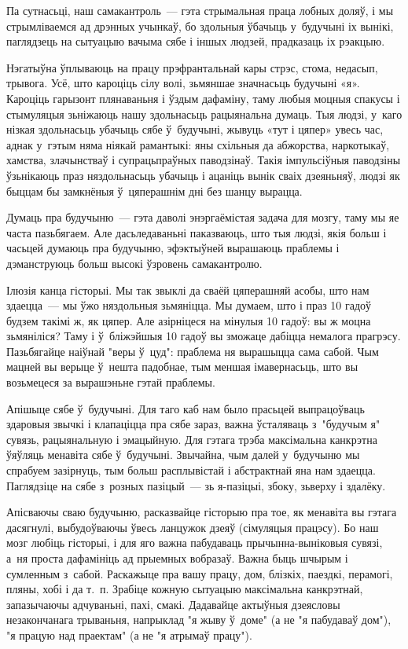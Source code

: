 Па сутнасьці, наш самакантроль~--- гэта стрымальная праца лобных доляў, і мы стрымліваемся ад дрэнных учынкаў, бо здольныя ўбачыць у~будучыні іх вынікі, паглядзець на сытуацыю вачыма сябе і іншых людзей, прадказаць іх рэакцыю.

Нэгатыўна ўплываюць на працу прэфрантальнай кары стрэс, стома, недасып, трывога. Усё, што кароціць сілу волі, зьмяншае значнасьць будучыні «я». Кароціць гарызонт плянаваньня і ўздым дафаміну, таму любыя моцныя спакусы і стымуляцыя зьніжаюць нашу здольнасьць рацыянальна думаць. Тыя людзі, у~каго нізкая здольнасьць убачыць сябе ў~будучыні, жывуць «тут і цяпер» увесь час, аднак у~гэтым няма ніякай рамантыкі: яны схільныя да абжорства, наркотыкаў, хамства, злачынстваў і супрацьпраўных паводзінаў. Такія імпульсіўныя паводзіны ўзьнікаюць праз няздольнасьць убачыць і ацаніць вынік сваіх дзеяньняў, людзі як быццам бы замкнёныя ў~цяперашнім дні без шанцу вырацца.

Думаць пра будучыню~--- гэта даволі энэргаёмістая задача для мозгу, таму мы яе часта пазьбягаем. Але дасьледаваньні паказваюць, што тыя людзі, якія больш і часьцей думаюць пра будучыню, эфэктыўней вырашаюць праблемы і дэманструюць больш высокі ўзровень самакантролю.

Ілюзія канца гісторыі. Мы так звыклі да сваёй цяперашняй асобы, што нам здаецца~--- мы ўжо няздольныя зьмяніцца. Мы думаем, што і праз 10 гадоў будзем такімі ж, як цяпер. Але азірніцеся на мінулыя 10 гадоў: вы ж моцна зьмяніліся? Таму і ў~бліжэйшыя 10 гадоў вы зможаце дабіцца немалога прагрэсу. Пазьбягайце наіўнай "веры ў~цуд": праблема ня вырашыцца сама сабой. Чым мацней вы верыце ў~нешта падобнае, тым меншая імавернасьць, што вы возьмецеся за вырашэньне гэтай праблемы.

Апішыце сябе ў~будучыні. Для таго каб нам было прасьцей выпрацоўваць здаровыя звычкі і клапаціцца пра сябе зараз, важна ўсталяваць з~"будучым я" сувязь, рацыянальную і эмацыйную. Для гэтага трэба максімальна канкрэтна ўяўляць менавіта сябе ў~будучыні. Звычайна, чым далей у~будучыню мы спрабуем зазірнуць, тым больш расплывістай і абстрактнай яна нам здаецца. Паглядзіце на сябе з~розных пазіцый~--- зь я-пазіцыі, збоку, зьверху і здалёку.

Апісваючы сваю будучыню, расказвайце гісторыю пра тое, як менавіта вы гэтага дасягнулі, выбудоўваючы ўвесь ланцужок дзеяў (сімуляцыя працэсу). Бо наш мозг любіць гісторыі, і для яго важна пабудаваць прычынна-выніковыя сувязі, а~ня проста дафамініць ад прыемных вобразаў. Важна быць шчырым і сумленным з~сабой. Раскажыце пра вашу працу, дом, блізкіх, паездкі, перамогі, пляны, хобі і да т.~п. Зрабіце кожную сытуацыю максімальна канкрэтнай, запазычаючы адчуваньні, пахі, смакі. Дадавайце актыўныя дзеясловы незакончанага трываньня, напрыклад "я жыву ў~доме" (а не "я пабудаваў дом"), "я працую над праектам" (а не "я атрымаў працу").

